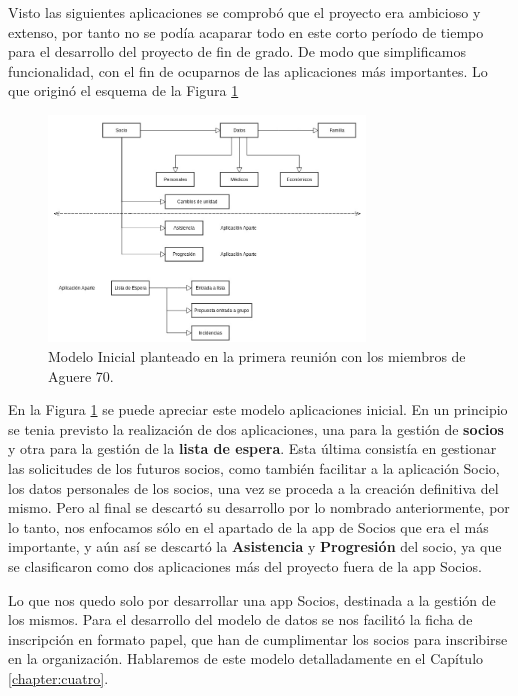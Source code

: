 Visto las siguientes aplicaciones se comprobó que el proyecto era ambicioso y extenso,
por tanto no se podía acaparar todo en este corto período de tiempo para el desarrollo del proyecto de fin de grado. De modo que simplificamos funcionalidad,
con el fin de ocuparnos de las aplicaciones más importantes. Lo que originó el esquema de la Figura \ref{fig:modelo_inicial}


\begin{figure}[H]
\begin{center}
\includegraphics[width=0.75\textwidth]{images/modelo_inicial.jpg}
\caption{Modelo Inicial planteado en la primera reunión con los miembros de Aguere 70.}
\label{fig:modelo_inicial}
\end{center}
\end{figure}

En la Figura \ref{fig:modelo_inicial} se puede apreciar este modelo aplicaciones inicial. En un principio se tenia previsto la realización de dos aplicaciones, 
una para la gestión de \textbf{socios} y otra para la gestión de la \textbf{lista de espera}. Esta última consistía en gestionar las solicitudes de los
futuros socios, como también facilitar a la aplicación Socio, los datos personales de los socios, una vez se proceda a la creación definitiva del mismo.
Pero al final se descartó su desarrollo por lo nombrado anteriormente, por lo tanto, nos enfocamos sólo en el apartado de la app de Socios que era el más importante, 
y aún así se descartó la \textbf{Asistencia} y \textbf{Progresión} del socio, ya que se clasificaron como dos aplicaciones más del proyecto fuera de la app Socios.

Lo que nos quedo solo por desarrollar una app Socios, destinada a la gestión de los mismos. Para el desarrollo del modelo de datos se nos facilitó
la ficha de inscripción en formato papel, que han de cumplimentar los socios para inscribirse en la organización. Hablaremos de este modelo detalladamente en el Capítulo \ref{chapter:cuatro}.


